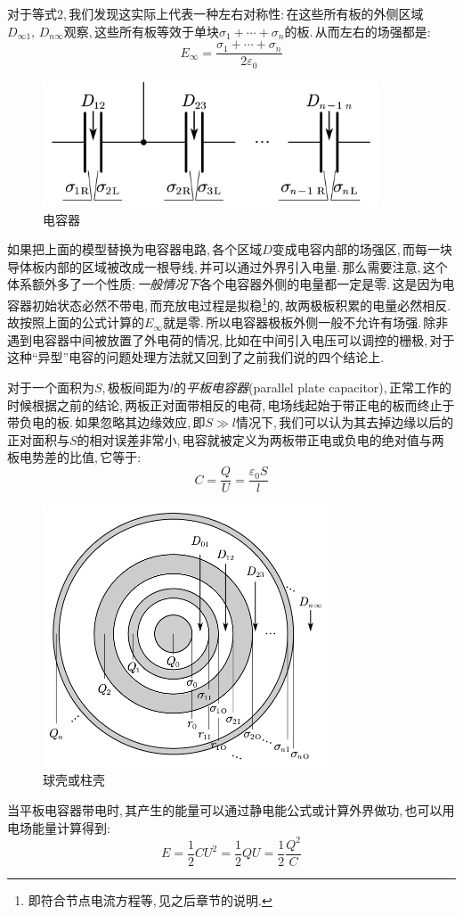 对于等式$2$,\,我们发现这实际上代表一种左右对称性:\,在这些所有板的外侧区域$D_{\infty 1},\,D_{n\infty}$观察,\,这些所有板等效于单块$\sigma_1+\cdots+\sigma_n$的板.\,从而左右的场强都是:
\[E_\infty=\frac{\sigma_1+\cdots+\sigma_n}{2\varepsilon_0}\]

\begin{figure}
\vspace{-0.2cm}
\centering
\includegraphics[width=10cm]{image/7-2-7.png}
\caption{电容器}\label{fig7-2-7}
\end{figure}
如果把上面的模型替换为电容器电路,\,各个区域$D$变成电容内部的场强区,\,而每一块导体板内部的区域被改成一根导线,\,并可以通过外界引入电量.\,那么需要注意,\,这个体系额外多了一个性质:\,\emph{一般情况下}各个电容器外侧的电量都一定是零.\,这是因为电容器初始状态必然不带电,\,而充放电过程是拟稳\footnote{即符合节点电流方程等,\,见之后章节的说明.}的,\,故两极板积累的电量必然相反.\,故按照上面的公式计算的$E_\infty$就是零.\,所以电容器极板外侧一般不允许有场强.\,除非遇到电容器中间被放置了外电荷的情况,\,比如在中间引入电压可以调控的栅极,\,对于这种``异型''电容的问题处理方法就又回到了之前我们说的四个结论上.

\vspace{0.5cm}
对于一个面积为$S$,\,极板间距为$l$的\emph{平板电容器}(parallel plate capacitor),\,正常工作的时候根据之前的结论,\,两板正对面带相反的电荷,\,电场线起始于带正电的板而终止于带负电的板.\,如果忽略其边缘效应,\,即$S\gg l$情况下,\,我们可以认为其去掉边缘以后的正对面积与$S$的相对误差非常小,\,电容就被定义为两板带正电或负电的绝对值与两板电势差的比值,\,它等于:
\[C=\frac{Q}{U}=\frac{\varepsilon_0S}{l}\]

\begin{figure}
\vspace{-0.5cm}
\centering
\includegraphics[width=8.5cm]{image/7-2-8.png}
\caption{球壳或柱壳}\label{fig7-2-8}
\end{figure}
当平板电容器带电时,\,其产生的能量可以通过静电能公式或计算外界做功,\,也可以用电场能量计算得到:
\[E=\frac{1}{2}CU^2=\frac{1}{2}QU=\frac{1}{2}\frac{Q^2}{C}\]

